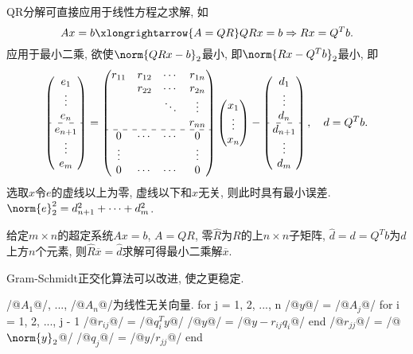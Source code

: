\documentclass[20pt]{extarticle}
\begin{document}
QR分解可直接应用于线性方程之求解, 如
\[ Ax = b \xlongrightarrow{A=QR} QRx = b \Rightarrow Rx = Q^Tb. \]
应用于最小二乘, 欲使$\norm{QRx-b}_2$最小, 即$\norm{Rx-Q^Tb}_2$最小, 即
\[ \begin{pmatrix}
    e_1 \\ \vdots \\ e_n \\\hdashline e_{n+1} \\ \vdots \\ e_m
\end{pmatrix} = \begin{pmatrix}
    r_{11} & r_{12} & \cdots & r_{1n} \\
    & r_{22} & \cdots & r_{2n} \\
    & & \ddots & \vdots \\
    & & & r_{nn} \\
    \hdashline
    0 & \cdots & \cdots & 0 \\
    \vdots & & & \vdots \\
    0 & \cdots & \cdots & 0
\end{pmatrix}\begin{pmatrix}
    x_1 \\ \vdots \\ x_n
\end{pmatrix} - \begin{pmatrix}
    d_1 \\ \vdots \\ d_n \\ \hdashline d_{n+1} \\ \vdots \\d_{m}
\end{pmatrix},\quad d = Q^Tb. \]
选取$x$令$e$的虚线以上为零, 虚线以下和$x$无关, 则此时具有最小误差. $\norm{e}_2^2 = d_{n+1}^2 + \cdots + d_{m}^2$.
\begin{theorem}
    给定$m\times n$的超定系统$Ax = b$, $A = QR$, 零$\hat R$为$R$的上$n\times n$子矩阵, $\hat d = d = Q^Tb$为$d$上方$n$个元素, 则$\hat R\overbar x = \hat d$求解可得最小二乘解$\overbar{x}$.
\end{theorem}
Gram-Schmidt正交化算法可以改进, 使之更稳定.
\begin{matlablst}
/@$A_1$@/, ..., /@$A_n$@/为线性无关向量.
for j = 1, 2, ..., n
    /@$y$@/ = /@$A_j$@/
    for i = 1, 2, ..., j - 1
        /@$r_{ij}$@/ = /@$q_i^T y$@/
        /@$y$@/ = /@$y - r_{ij}q_i$@/
    end
    /@$r_{jj}$@/ = /@$\norm{y}_2$@/
    /@$q_j$@/ = /@$y/r_{jj}$@/
end
\end{matlablst}
\end{document}
